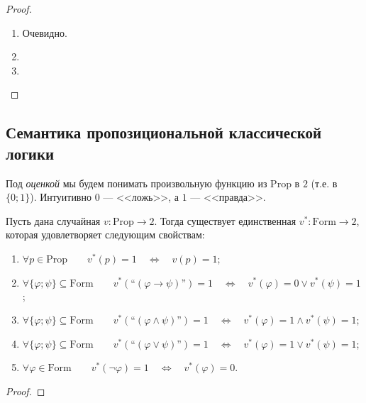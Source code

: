 \documentclass[12pt,a4paper]{article}
\newcommand{\Prop}{\ensuremath{\mathrm{Prop}}\xspace}
\newcommand{\Formul}{\ensuremath{\mathrm{Form}}\xspace}
\begin{document}
    \begin{proof}
        \begin{enumerate}
            \item Очевидно.
            \item {}
            \item {}
        \end{enumerate}
    \end{proof}

    \subsection{Семантика пропозициональной классической логики}

    \begin{definition}
        Под \emph{оценкой} мы будем понимать произвольную функцию из $\Prop$ в $2$ (т.е. в $\{0; 1\}$). Интуитивно $0$ --- <<ложь>>, а $1$ --- <<правда>>.
    \end{definition}

    \begin{theorem}
        Пусть дана случайная $v: \Prop \to 2$. Тогда существует единственная $v^*: \Formul \to 2$, которая удовлетворяет следующим свойствам:
        \begin{enumerate}
            \item $\forall p \in \Prop\qquad v^*(p) = 1 \quad \Longleftrightarrow \quad v(p) = 1$;
            \item $\forall \{\varphi; \psi\} \subseteq \Formul\qquad v^*(\text{``$(\varphi \rightarrow \psi)$''}) = 1 \quad \Longleftrightarrow \quad v^*(\varphi) = 0 \vee v^*(\psi) = 1$;
            \item $\forall \{\varphi; \psi\} \subseteq \Formul\qquad v^*(\text{``$(\varphi \wedge \psi)$''}) = 1 \quad \Longleftrightarrow \quad v^*(\varphi) = 1 \wedge v^*(\psi) = 1$;
            \item $\forall \{\varphi; \psi\} \subseteq \Formul\qquad v^*(\text{``$(\varphi \vee \psi)$''}) = 1 \quad \Longleftrightarrow \quad v^*(\varphi) = 1 \vee v^*(\psi) = 1$;
            \item $\forall \varphi \in \Formul\qquad v^*(\neg \varphi) = 1 \quad \Longleftrightarrow \quad v^*(\varphi) = 0$.
        \end{enumerate}
    \end{theorem}

    \begin{proof}
    \end{proof}
\end{document}
